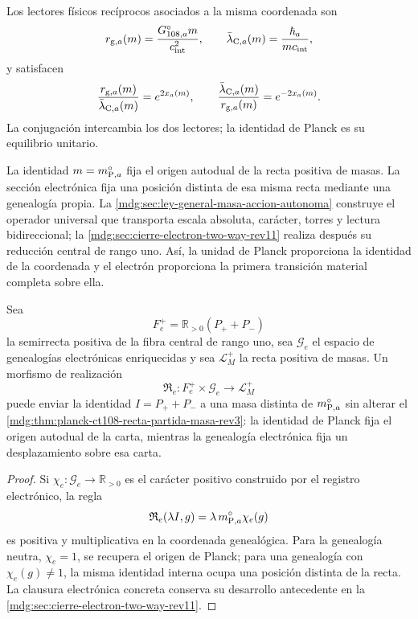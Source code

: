 Los lectores físicos recíprocos asociados a la misma coordenada son
\[
 r_{{\rm g},a}(m)=\frac{G_{108,a}^{\circ}m}{c_{\rm int}^{2}},
 \qquad
 \bar\lambda_{{\rm C},a}(m)=\frac{\hbar_a}{mc_{\rm int}},
\]
y satisfacen
\begin{equation}
 \frac{r_{{\rm g},a}(m)}{\bar\lambda_{{\rm C},a}(m)}
 =e^{2x_a(m)},
 \qquad
 \frac{\bar\lambda_{{\rm C},a}(m)}{r_{{\rm g},a}(m)}
 =e^{-2x_a(m)}.
 \label{mdg:eq:planck-ct108-lectores-exponenciales-rev3}
\end{equation}
La conjugación intercambia los dos lectores; la identidad de Planck es su
equilibrio unitario.

\begin{remark}
La identidad \(m=m_{{\rm P},a}^{\circ}\) fija el origen autodual de la recta
positiva de masas. La sección electrónica fija una posición distinta de
esa misma recta mediante una genealogía propia. La
\cref{mdg:sec:ley-general-masa-accion-autonoma} construye el operador universal
que transporta escala absoluta, carácter, torres y lectura bidireccional;
la \cref{mdg:sec:cierre-electron-two-way-rev11} realiza después su reducción
central de rango uno. Así, la unidad de Planck proporciona la identidad de
la coordenada y el electrón proporciona la primera transición material
completa sobre ella.
\end{remark}

\begin{proposition}
\label{mdg:prop:planck-ct108-realizacion-centro-electron-rev3}
Sea
\[
 F_e^+=\mathbb R_{>0}(P_++P_-)
\]
la semirrecta positiva de la fibra central de rango uno, sea
\(\mathcal G_e\) el espacio de genealogías
electrónicas enriquecidas y sea \(\mathcal L_M^+\) la recta positiva de
masas. Un morfismo de realización
\[
 \mathfrak R_e:
 F_e^+\times\mathcal G_e\longrightarrow\mathcal L_M^+
\]
puede enviar la identidad \(I=P_++P_-\) a una masa distinta de
\(m_{{\rm P},a}^{\circ}\) sin alterar el
\cref{mdg:thm:planck-ct108-recta-partida-masa-rev3}: la identidad de Planck fija el
origen autodual de la carta, mientras la genealogía electrónica fija un
desplazamiento sobre esa carta.
\end{proposition}

\begin{proof}
Si \(\chi_e:\mathcal G_e\to\mathbb R_{>0}\) es el carácter positivo construido
por el registro electrónico, la regla
\[
 \mathfrak R_e(\lambda I,g)
 =\lambda\,m_{{\rm P},a}^{\circ}\chi_e(g)
\]
es positiva y multiplicativa en la coordenada genealógica. Para la genealogía
neutra, \(\chi_e=1\), se recupera el origen de Planck; para una genealogía con
\(\chi_e(g)\ne1\), la misma identidad interna ocupa una posición distinta de
la recta. La clausura electrónica concreta conserva su desarrollo antecedente en la
\cref{mdg:sec:cierre-electron-two-way-rev11}.
\end{proof}
